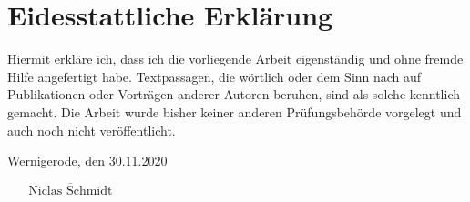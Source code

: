 \section*{Eidesstattliche Erklärung}

\vspace{10mm}

Hiermit erkläre ich, dass ich die vorliegende Arbeit eigenständig und ohne 
fremde Hilfe angefertigt habe. Textpassagen, die wörtlich oder dem Sinn nach 
auf Publikationen oder Vorträgen anderer Autoren beruhen, sind als solche 
kenntlich gemacht. Die Arbeit wurde bisher keiner anderen Prüfungsbehörde vorgelegt und auch
 noch nicht veröffentlicht.

 \vspace{10mm}

 Wernigerode, den 30.11.2020

 \begin{flushright}
    $ \overline{\mbox{~~~~~Niclas Schmidt~~~~~}} $  
 \end{flushright}
